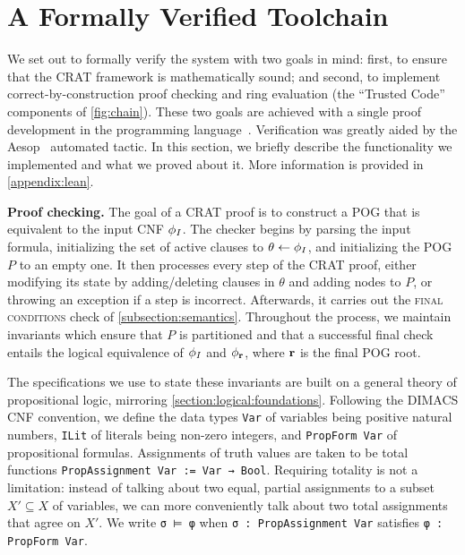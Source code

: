 \section{A Formally Verified Toolchain}
\label{section:formally-verified-toolchain}

We set out to formally verify the system with two goals in mind: first, to ensure that the CRAT framework is mathematically
sound; and second, to implement correct-by-construction proof checking and ring evaluation (the ``Trusted Code'' components of \cref{fig:chain}). These two goals are achieved with a single proof development in the \lean{} programming language~\cite{demoura:cade:2021}. Verification was greatly aided by the Aesop~\cite{23limperg_aesop_white_box_best_first_proof_search_lean} automated tactic. In this section, we briefly describe the functionality we implemented and what we proved about it. More information is provided in \cref{appendix:lean}.

\vspace{1em}\noindent
\textbf{Proof checking.} The goal of a CRAT proof is to construct a POG that is equivalent to the input CNF $\phi_I$. The checker begins by parsing the input formula, initializing the set of active clauses to $\theta \leftarrow \phi_I$, and initializing the POG $P$ to an empty one. It then processes every step of the CRAT proof, either modifying its state by adding/deleting clauses in $\theta$ and adding nodes to $P$, or throwing an exception if a step is incorrect. Afterwards, it carries out the \textsc{final conditions} check of \cref{subsection:semantics}. Throughout the process, we maintain invariants which ensure that $P$ is partitioned and that a successful final check entails the logical equivalence of $\phi_I$ and $\phi_{\mathbf{r}}$, where $\mathbf{r}$ is the final POG root.

The specifications we use to state these invariants are built on a general theory of propositional logic, mirroring \cref{section:logical:foundations}. Following the DIMACS CNF convention, we define the data types \lstinline{Var} of variables being positive natural numbers, \lstinline{ILit} of literals being non-zero integers, and \lstinline{PropForm Var} of propositional formulas. Assignments of truth values are taken to be total functions \lstinline{PropAssignment Var := Var → Bool}. Requiring totality is not a limitation: instead of talking about two equal, partial assignments to a subset $X' \subseteq X$ of variables, we can more conveniently talk about two total assignments that agree on $X'$. We write \lstinline{σ ⊨ φ} when \lstinline{σ : PropAssignment Var} satisfies \lstinline{φ : PropForm Var}.

